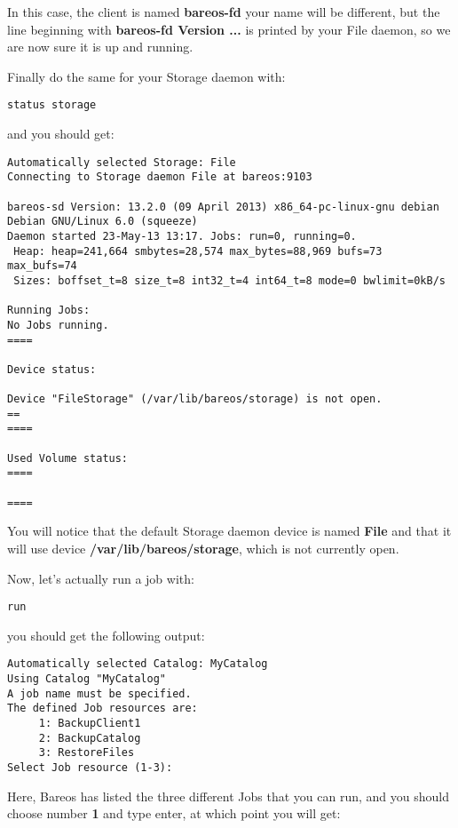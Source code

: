 In this case, the client is named {\bf bareos-fd} your name will be different,
but the line beginning with {\bf bareos-fd Version ...} is printed by your File
daemon, so we are now sure it is up and running.

Finally do the same for your Storage daemon with:

\footnotesize
\begin{verbatim}
status storage
\end{verbatim}
\normalsize

and you should get:

\footnotesize
\begin{verbatim}
Automatically selected Storage: File
Connecting to Storage daemon File at bareos:9103

bareos-sd Version: 13.2.0 (09 April 2013) x86_64-pc-linux-gnu debian Debian GNU/Linux 6.0 (squeeze)
Daemon started 23-May-13 13:17. Jobs: run=0, running=0.
 Heap: heap=241,664 smbytes=28,574 max_bytes=88,969 bufs=73 max_bufs=74
 Sizes: boffset_t=8 size_t=8 int32_t=4 int64_t=8 mode=0 bwlimit=0kB/s

Running Jobs:
No Jobs running.
====

Device status:

Device "FileStorage" (/var/lib/bareos/storage) is not open.
==
====

Used Volume status:
====

====

\end{verbatim}
\normalsize

You will notice that the default Storage daemon device is named {\bf File} and
that it will use device {\bf /var/lib/bareos/storage}, which is not currently open.

Now, let's actually run a job with:

\footnotesize
\begin{verbatim}
run
\end{verbatim}
\normalsize

you should get the following output:

\footnotesize
\begin{verbatim}
Automatically selected Catalog: MyCatalog
Using Catalog "MyCatalog"
A job name must be specified.
The defined Job resources are:
     1: BackupClient1
     2: BackupCatalog
     3: RestoreFiles
Select Job resource (1-3):
\end{verbatim}
\normalsize

Here, Bareos has listed the three different Jobs that you can run, and you
should choose number {\bf 1} and type enter, at which point you will get:

